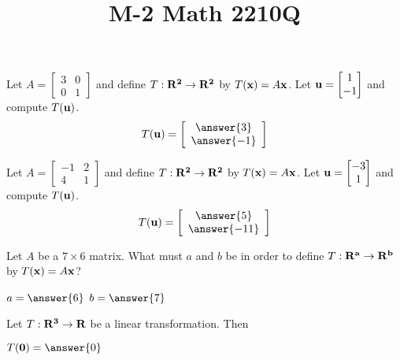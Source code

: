 \documentclass{ximera}
\newcommand{\bu}{{\bf u}}
\newcommand{\bx}{{\bf x}}
\newcommand{\RR}{\bf R}
\begin{document}
  	\title{M-2  \hfill Math 2210Q} 

  	
  
 

  	 	\begin{question} Let $A = \begin{bmatrix}
  	 		3 &0\\
  	 		0&1
  	 		\end{bmatrix}$ and define $T: \RR^2 \to \RR^2$ by $T(\bx) = A\bx$.  Let $\bu = \begin{bmatrix} 1\\-1 \end{bmatrix}$ and compute $T(\bu)$.\\
  	 		
 $$T(\bu) = \left[ \begin{array}{c} \answer{3} \\ \answer{-1} \end{array} \right]$$

 
  	
  		\end{question}
  		
  		
  		
  		\begin{question} Let $A = \begin{bmatrix}
  			-1 &2\\
  			4&1
  			\end{bmatrix}$ and define $T: \RR^2 \to \RR^2$ by $T(\bx) = A\bx$.  Let $\bu = \begin{bmatrix} -3\\1 \end{bmatrix}$ and compute $T(\bu)$.\\
  			
  			$$T(\bu) = \left[ \begin{array}{c} \answer{5} \\ \answer{-11} \end{array} \right]$$
  			
  			
  			
  		\end{question}
  		
  		
  		\begin{question} Let $A$ be a $7\times 6$ matrix. What must $a$ and $b$ be in order to define $T: \RR^a \to \RR^b$ by $T(\bx) = A\bx$?
  			
  		\begin{center}$a= \answer{6}$ \hspace{20pt} $b = \answer{7}$\end{center}
  		
  		\end{question}
  			
  				\begin{question} Let $T:\RR^3 \to \RR$ be a linear transformation. Then
  					
  					\begin{center}$T({\bf 0}) = \answer{0}$\end{center}
  					
  				\end{question}
  		
  
\end{document}
